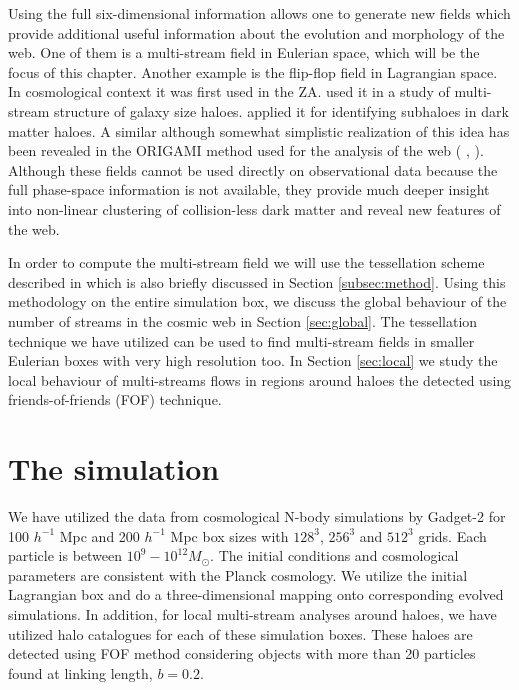 Using the full six-dimensional information allows one to generate new fields which  provide 
additional useful information about the evolution and morphology of the  web. 
One of them is a multi-stream field in Eulerian space, which will be the focus of this chapter. 
Another example is the flip-flop field in Lagrangian space. In cosmological context it was first used in the ZA.
\citet{Vogelsberger2011} used it in a study of multi-stream structure of galaxy size haloes.
\citet{Shandarin2014a} applied it for identifying subhaloes  in dark matter haloes.
A similar although somewhat simplistic realization of this idea has been revealed in the ORIGAMI method
used for the analysis of the web ( \citealt{Falck2012},  \citealt{Falck2015} ).
 Although these fields cannot be used directly on observational data because the full phase-space information
 is not available, they provide much deeper insight into non-linear clustering of collision-less dark matter
and reveal new features of the web.


In order to compute the multi-stream field we will use the tessellation scheme described in
 \citet{Shandarin2012} which is  also briefly discussed in Section \ref{subsec:method}.
  Using this methodology on the entire simulation box, we discuss the global behaviour of the number of streams in the cosmic web in Section \ref{sec:global}. 
  The tessellation technique we have utilized can be used to find multi-stream fields in smaller Eulerian boxes with very high resolution too. In Section \ref{sec:local} we study the local behaviour of multi-streams flows in regions around haloes the detected using friends-of-friends (FOF) technique.
 
 


\section{The simulation}
\label{sec:simulation}


We have utilized the data from cosmological N-body simulations by Gadget-2 \citep{Springel2005c} for 100 $h^{-1}$ Mpc  and 200 $h^{-1}$ Mpc box 
sizes with $128^3$, $256^3$ and $512^3$ grids. Each particle is between  $10^9 - 10^{12} M_{\odot}$. 
The initial conditions and cosmological parameters are consistent with the Planck cosmology. We utilize the initial Lagrangian box and do a three-dimensional mapping onto corresponding evolved simulations. In addition, for local multi-stream analyses around haloes, we have utilized halo catalogues for each of these simulation boxes. These haloes are detected using FOF method considering objects with more than 20 particles found at linking length, $ b= 0.2$.  
